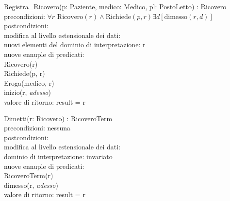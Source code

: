 \documentclass[a4paper,12pt]{report}
\begin{document}
        \hspace*{-0.75cm}
        \hspace*{1cm}Registra\_Ricovero(p: Paziente, medico: Medico, pl: PostoLetto) : Ricovero \\
        \hspace*{2cm}precondizioni: $\forall r \text{ Ricovero}(r) \wedge \text{Richiede}(p, r) \exists d [\text{dimesso}(r, d)]$ \\
        \hspace*{2cm}postcondizioni: \\
        \hspace*{3cm}modifica al livello estensionale dei dati: \\
        \hspace*{4cm}nuovi elementi del dominio di interpretazione: r \\
        \hspace*{4cm}nuove ennuple di predicati: \\
        \hspace*{5cm}Ricovero(r) \\
        \hspace*{5cm}Richiede(p, r) \\
        \hspace*{5cm}Eroga(medico, r) \\
        \hspace*{5cm}inizio(r, \textit{adesso}) \\
        \hspace*{3cm}valore di ritorno: result = r \\

        \newpage

        \hspace*{-0.75cm}
        \hspace*{1cm}Dimetti(r: Ricovero) : RicoveroTerm \\
        \hspace*{2cm}precondizioni: nessuna \\
        \hspace*{2cm}postcondizioni: \\
        \hspace*{3cm}modifica al livello estensionale dei dati: \\
        \hspace*{4cm}dominio di interpretazione: invariato \\
        \hspace*{4cm}nuove ennuple di predicati: \\
        \hspace*{5cm}RicoveroTerm(r) \\
        \hspace*{5cm}dimesso(r, \textit{adesso}) \\
        \hspace*{3cm}valore di ritorno: result = r \\
\end{document}
